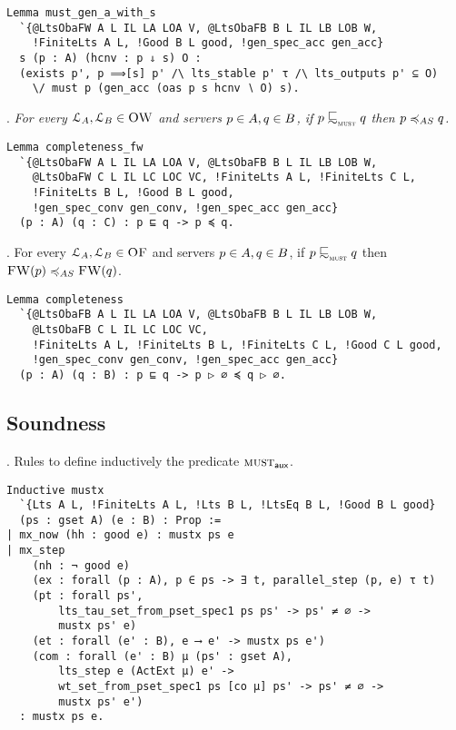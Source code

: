 \begin{mdframed}
\begin{verbatim}
Lemma must_gen_a_with_s
  `{@LtsObaFW A L IL LA LOA V, @LtsObaFB B L IL LB LOB W,
    !FiniteLts A L, !Good B L good, !gen_spec_acc gen_acc}
  s (p : A) (hcnv : p ⇓ s) O :
  (exists p', p ⟹[s] p' /\ lts_stable p' τ /\ lts_outputs p' ⊆ O)
    \/ must p (gen_acc (oas p s hcnv ∖ O) s).
\end{verbatim}
\end{mdframed}

\noindent
{}.\emph{
For every $\mathcal{L}_A, \mathcal{L}_B \in \textsc{OW}$ and
servers $p \in A, q \in B $,
if ${ \serverA } \testleqS { \serverB }$
then ${ \serverA } \asleq { \serverB }$.
}

\begin{mdframed}
\begin{verbatim}
Lemma completeness_fw
  `{@LtsObaFW A L IL LA LOA V, @LtsObaFB B L IL LB LOB W,
    @LtsObaFW C L IL LC LOC VC, !FiniteLts A L, !FiniteLts C L,
    !FiniteLts B L, !Good B L good,
    !gen_spec_conv gen_conv, !gen_spec_acc gen_acc}
  (p : A) (q : C) : p ⊑ q -> p ≼ q.
\end{verbatim}
\end{mdframed}

\noindent
{}.
For every $\mathcal{L}_A, \mathcal{L}_B \in \textsc{OF}$ and
servers $p \in A, q \in B $,
if $\serverA \testleqS \serverB$ then $\liftFW{ \serverA } \asleq \liftFW{ \serverB }$.

\begin{mdframed}
\begin{verbatim}
Lemma completeness
  `{@LtsObaFB A L IL LA LOA V, @LtsObaFB B L IL LB LOB W,
    @LtsObaFB C L IL LC LOC VC,
    !FiniteLts A L, !FiniteLts B L, !FiniteLts C L, !Good C L good,
    !gen_spec_conv gen_conv, !gen_spec_acc gen_acc}
  (p : A) (q : B) : p ⊑ q -> p ▷ ∅ ≼ q ▷ ∅.
\end{verbatim}
\end{mdframed}

\subsection{Soundness}

. Rules to define inductively the predicate $\operatorname{\textsc{must}}_{\textsf{aux}}$.

\begin{mdframed}
\begin{verbatim}
Inductive mustx
  `{Lts A L, !FiniteLts A L, !Lts B L, !LtsEq B L, !Good B L good}
  (ps : gset A) (e : B) : Prop :=
| mx_now (hh : good e) : mustx ps e
| mx_step
    (nh : ¬ good e)
    (ex : forall (p : A), p ∈ ps -> ∃ t, parallel_step (p, e) τ t)
    (pt : forall ps',
        lts_tau_set_from_pset_spec1 ps ps' -> ps' ≠ ∅ ->
        mustx ps' e)
    (et : forall (e' : B), e ⟶ e' -> mustx ps e')
    (com : forall (e' : B) μ (ps' : gset A),
        lts_step e (ActExt μ) e' ->
        wt_set_from_pset_spec1 ps [co μ] ps' -> ps' ≠ ∅ ->
        mustx ps' e')
  : mustx ps e.
\end{verbatim}
\end{mdframed}

